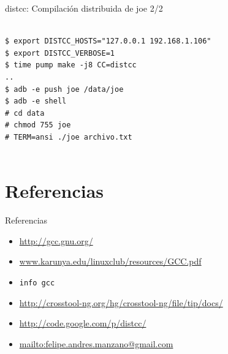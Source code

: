 \documentclass[xetex]{beamer}
\begin{document}
\begin{frame}[fragile]{distcc: Compilación distribuida de joe 2/2}
\begin{verbatim}

$ export DISTCC_HOSTS="127.0.0.1 192.168.1.106"
$ export DISTCC_VERBOSE=1
$ time pump make -j8 CC=distcc
..
$ adb -e push joe /data/joe
$ adb -e shell
# cd data
# chmod 755 joe
# TERM=ansi ./joe archivo.txt
 
\end{verbatim}
\end{frame}



\section{Referencias}

\begin{frame}[fragile]{Referencias}
\begin{itemize}
\item \url{http://gcc.gnu.org/}
\item \url{www.karunya.edu/linuxclub/resources/GCC.pdf}
\item \verb=info gcc=
\item \url{http://crosstool-ng.org/hg/crosstool-ng/file/tip/docs/}
\item \url{http://code.google.com/p/distcc/}
\item \url{mailto:felipe.andres.manzano@gmail.com}
\end{itemize}
\end{frame}
 
{
\begin{frame}{}\end{frame}
}
\end{document}
